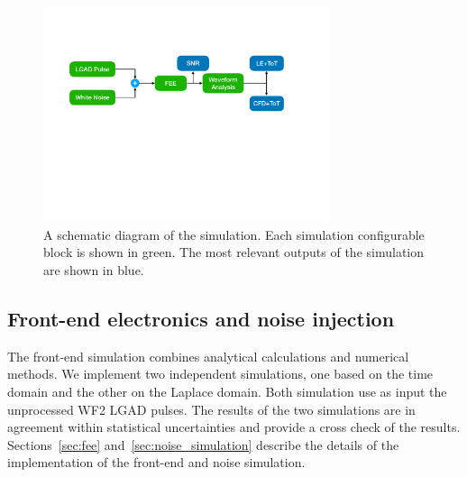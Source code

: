 \documentclass[preprint,1p]{elsarticle}
\begin{document}
\begin{figure}[htbp]
\centering
\includegraphics[width=0.75\textwidth]{figs/lgad_simulation_diagram.pdf}
\caption{A schematic diagram of the simulation. Each simulation configurable block is shown in green. The most relevant outputs
of the simulation are shown in blue.}
\label{fig:simulation_diagram}
\end{figure}


\subsection{Front-end electronics and noise injection}
\label{sub_sec:fee_simulation_and_noise}
The front-end simulation combines analytical calculations and
numerical methods. We implement two independent simulations,
one based on the time domain and the other on the Laplace domain. Both simulation use as input
 the unprocessed WF2 LGAD pulses. The results of the two simulations
 are in agreement within statistical uncertainties and provide a cross check of the results.
 Sections~\ref{sec:fee} and~\ref{sec:noise_simulation} describe
the details of the implementation of the front-end and noise simulation.
\end{document}
